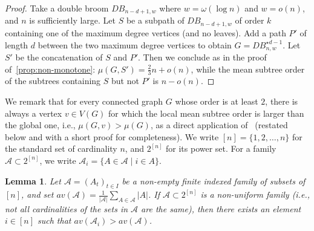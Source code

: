 \documentclass[11pt]{article}
\newtheorem{lem}[thr]{Lemma}
\theoremstyle{definition}
\def\A{\mathcal{A}}
\newcommand*{\abs}[1]{\lvert #1\rvert}
\newcommand*{\av}{av}
\begin{document}
\begin{proof}
 Take a double broom $DB_{n-d+1,w}$ where $w=\omega(\log n)$ and $w=o(n)$, and $n$ is sufficiently large. Let $S$ be a subpath of $DB_{n-d+1,w}$ of order $k$ containing one of the maximum degree vertices (and no leaves).
 Add a path $P'$ of length $d$ between the two maximum degree vertices  to obtain $G=DB_{n,w}^{\star d-1}.$
 Let $S'$ be the concatenation of $S$ and $P'$. Then we conclude as in the proof of~\cref{prop:non-monotone}: $\mu(G, S') = \frac 23n + o(n)$, while the mean subtree order of the subtrees containing $S$ but not $P'$ is $n-o(n).$
\end{proof}

We remark that for every connected graph $G$ whose order is at least $2$, there is always a vertex $v \in V(G)$ for which the local mean subtree order is larger than the global one, i.e., $\mu(G,v)>\mu(G)$, as a direct application of~\cite[Thm.~3.1]{ARW20} (restated below and with a short proof for completeness). We write $[n]=\{1,2,\ldots,n\}$ for the standard set of cardinality $n$, and $2^{[n]}$ for its power set.
For a family $\A \subset 2^{[n]}$, we write $\A_i=\{A \in \A \mid i \in A\}.$
\begin{lem}
Let $\mathcal A=(A_t)_{t\in I}$ be a non-empty finite indexed
family of subsets of $[n]$, and set
 $\av(\A)=\frac{1}{\abs \A} \sum_{A\in \A} \abs A$.
 If $\A \subset 2^{[n]}$ is a non-uniform family (i.e., not all cardinalities of the sets in $\A$ are the same), then there exists an element $i \in [n]$ such that 
 $\av(\A_i)>\av(\A)$.
\end{lem}
\end{document}
